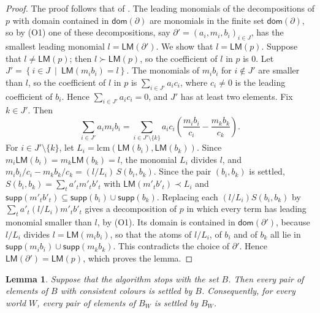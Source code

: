 \documentclass[12pt,a4paper,article]{memoir}
\newcommand{\setof}[2]{\left\{#1\ \mid\ #2 \right\}}
\newcommand{\supp}{\mathsf{supp}}
\newcommand{\LM}{\mathsf{LM}}
\newtheorem{lemma}[theorem]{Lemma}
\theoremstyle{definition}
\begin{document}
\begin{proof}
The proof follows that of \cite[Lemma 24]{GL25}.
The leading monomials of the decompositions of $p$ with domain contained in $\mathsf{dom}(\partial)$
are monomials in the finite set $\mathsf{dom}(\partial)$, so by (O1) one of these decompositions,
say $\partial' = (a_i, m_i, b_i)_{i \in J}$, has the smallest leading monomial $l = \LM(\partial')$.
We show that $l = \LM(p)$.
Suppose that $l \neq \LM(p)$; then $l \succ \LM(p)$, so the coefficient of $l$ in $p$ is $0$.
Let $J' = \setof{i \in J}{\LM(m_i b_i) = l}$.
The monomials of $m_i b_i$ for $i \notin J'$ are smaller than $l$,
so the coefficient of $l$ in $p$ is $\sum_{i \in J'} a_i c_i$, where $c_i \neq 0$ is the leading coefficient of $b_i$.
Hence $\sum_{i \in J'} a_i c_i = 0$, and $J'$ has at least two elements.
Fix $k \in J'$. Then
\[
\sum_{i \in J'} a_i m_i b_i = \sum_{i \in J' \setminus \{k\}} a_i c_i \left( \frac{m_i b_i}{c_i} - \frac{m_k b_k}{c_k} \right).
\]
For $i \in J' \setminus \{k\}$, let $L_i = \mathrm{lcm}(\LM(b_i), \LM(b_k))$.
Since $m_i \LM(b_i) = m_k \LM(b_k) = l$, the monomial $L_i$ divides $l$, and
$m_i b_i / c_i - m_k b_k / c_k = (l / L_i)\, S(b_i, b_k)$.
Since the pair $(b_i, b_k)$ is settled, $S(b_i, b_k) = \sum_t a'_t m'_t b'_t$
with $\LM(m'_t b'_t) \prec L_i$ and $\supp(m'_t b'_t) \subseteq \supp(b_i) \cup \supp(b_k)$.
Replacing each $(l/L_i) S(b_i, b_k)$ by $\sum_t a'_t (l/L_i) m'_t b'_t$
gives a decomposition of $p$ in which every term has leading monomial smaller than $l$, by (O1).
Its domain is contained in $\mathsf{dom}(\partial')$,
because $l / L_i$ divides $l = \LM(m_i b_i)$, so that the atoms of $l / L_i$, of $b_i$ and of $b_k$
all lie in $\supp(m_i b_i) \cup \supp(m_k b_k)$.
This contradicts the choice of $\partial'$. Hence $\LM(\partial') = \LM(p)$, which proves the lemma.
\end{proof}

\begin{lemma}\label{lem:settled}
Suppose that the algorithm stops with the set $B$.
Then every pair of elements of $B$ with consistent colours is settled by $B$.
Consequently, for every world $W$, every pair of elements of $B_W$ is settled by $B_W$.
\end{lemma}
\end{document}
